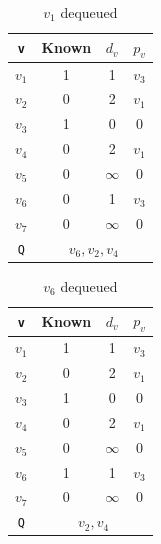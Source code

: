 \begin{minipage}{0.33\textwidth}
  \begin{table}[H]
    \centering
    \begin{tabular}{c|c|c|c}
        \toprule
        \verb|v| & Known & \(d_v\) & \(p_v\)  \\
      \midrule
        \(v_1\) & 1 & 1 & \(v_3\)  \\
        \(v_2\) & 0 & 2 & \(v_1\)  \\
        \(v_3\) & 1 & 0 & 0  \\
        \(v_4\) & 0 & 2 & \(v_1\)  \\
        \(v_5\) & 0 & \(\infty\) & 0  \\
        \(v_6\) & 0 & 1 & \(v_3\)  \\
        \(v_7\) & 0 & \(\infty\) & 0  \\
      \midrule
        \verb|Q| & \multicolumn{3}{c}{\(v_6, v_2, v_4\)} \\
      \bottomrule
    \end{tabular}
    \caption*{\(v_1\) dequeued}
  \end{table}
\end{minipage}
\begin{minipage}{0.33\textwidth}
  \begin{table}[H]
    \centering
    \begin{tabular}{c|c|c|c}
        \toprule
        \verb|v| & Known & \(d_v\) & \(p_v\)  \\
      \midrule
        \(v_1\) & 1 & 1 & \(v_3\)  \\
        \(v_2\) & 0 & 2 & \(v_1\)  \\
        \(v_3\) & 1 & 0 & 0  \\
        \(v_4\) & 0 & 2 & \(v_1\)  \\
        \(v_5\) & 0 & \(\infty\) & 0  \\
        \(v_6\) & 1 & 1 & \(v_3\)  \\
        \(v_7\) & 0 & \(\infty\) & 0  \\
      \midrule
        \verb|Q| & \multicolumn{3}{c}{\(v_2, v_4\)} \\
      \bottomrule
    \end{tabular}
    \caption*{\(v_6\) dequeued}
  \end{table}
\end{minipage}
